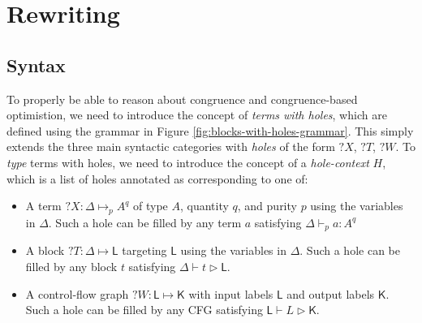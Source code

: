 \documentclass[acmsmall,screen,review]{acmart}
\newcounter{todos}
\newcommand{\TODO}[1]{{
  \stepcounter{todos}
  \begin{center}\large{\textcolor{red}{\textbf{TODO \arabic{todos}:} #1}}\end{center}
}}
\newcommand{\ms}[1]{\ensuremath{\mathsf{#1}}}
\newcommand{\hasty}[5]{#1 \vdash_{#2} #3: {#4}^{#5}}
\newcommand{\haslb}[3]{#1 \vdash #2 \rhd #3}
\newcommand{\lhaslb}[3]{#1 \vdash #2 \rhd #3}
\newcommand{\lhole}[1]{?#1}
\newcommand{\tyhole}[5]{#1: #2 \mapsto_{#3} {#4}^{#5}}
\newcommand{\blkhole}[3]{#1: #2 \mapsto #3}
\newcommand{\cfghole}[3]{#1: #2 \mapsto #3}
\begin{document}

\section{Rewriting}

\label{apx:rewriting}

\subsection{Syntax}

To properly be able to reason about congruence and congruence-based
optimistion, we need to introduce the concept of \textit{terms with holes},
which are defined using the grammar in Figure
\ref{fig:blocks-with-holes-grammar}. This simply extends the three main
syntactic categories with \textit{holes} of the form \(\lhole{X}\),
\(\lhole{T}\), \(\lhole{W}\). To \textit{type} terms with holes, we need to
introduce the concept of a \textit{hole-context} \(H\), which is a list of holes
annotated as corresponding to one of:
\begin{itemize}
  \item A term \(\tyhole{\lhole{X}}{\Delta}{p}{A}{q}\) of type \(A\), quantity
  \(q\), and purity \(p\) using the variables in \(\Delta\). Such a hole can be
  filled by any term \(a\) satisfying \(\hasty{\Delta}{p}{a}{A}{q}\)
  \item A block \(\blkhole{\lhole{T}}{\Delta}{\ms{L}}\) targeting \(\ms{L}\)
  using the variables in \(\Delta\). Such a hole can be filled by any block
  \(t\) satisfying \(\haslb{\Delta}{t}{\ms{L}}\).
  \item A control-flow graph \(\cfghole{\lhole{W}}{\ms{L}}{\ms{K}}\) with input
  labels \(\ms{L}\) and output labels \(\ms{K}\). Such a hole can be filled by
  any CFG satisfying \(\lhaslb{\ms{L}}{L}{\ms{K}}\).
\end{itemize}
\end{document}
